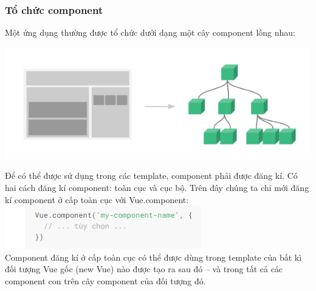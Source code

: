 \documentclass[12pt,a4paper]{report}
\begin{document}
\subsubsection{Tổ chức component}
Một ứng dụng thường được tổ chức dưới dạng một cây component lồng nhau: \begin{center}
	\includegraphics[scale=.7]{60}
\end{center} Để có thể được sử dụng trong các template, component phải được đăng kí. Có hai cách đăng kí component: toàn cục và cục bộ. Trên đây chúng ta chỉ mới đăng kí component ở cấp toàn cục với Vue.component: \\\includegraphics[scale=1]{61}\\Component đăng kí ở cấp toàn cục có thể được dùng trong template của bất kì đối tượng Vue gốc (new Vue) nào được tạo ra sau đó – và trong tất cả các component con trên cây component của đối tượng đó.
\end{document}
